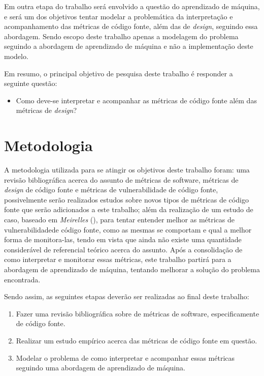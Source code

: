 Em outra etapa do trabalho será envolvido a questão do aprendizado de máquina, e
será um dos objetivos tentar modelar a problemática da interpretação e
acompanhamento das métricas de código fonte, além das de \textit{design},
seguindo essa abordagem. Sendo escopo deste trabalho apenas a modelagem do
problema seguindo a abordagem de aprendizado de máquina e não a implementação
deste modelo.

Em resumo, o principal objetivo de pesquisa deste trabalho é responder a
seguinte questão:

\begin{itemize}
  \item Como deve-se interpretar e acompanhar as métricas de código fonte além 
    das métricas de \textit{design}?
\end{itemize}


\section{Metodologia}

A metodologia utilizada para se atingir os objetivos deste trabalho foram: uma
revisão bibliográfica acerca do assunto de métricas de software, métricas de
\textit{design} de código fonte e métricas de vulnerabilidade de código fonte,
possivelmente serão realizados estudos sobre novos tipos de métricas de código
fonte que serão adicionados a este trabalho; além da realização de um estudo de 
caso, baseado em \emph{Meirelles} (\citeyear{meirelles2013}), para tentar entender 
melhor as métricas de vulnerabilidadede código fonte, como as mesmas se comportam 
e qual a melhor forma de monitora-las, tendo em vista que ainda não existe uma
quantidade considerável de referencial teórico acerca do assunto. Após a
consolidação de como interpretar e monitorar essas métricas, este trabalho
partirá para a abordagem de aprendizado de máquina, tentando melhorar a solução
do problema encontrada.

Sendo assim, as seguintes etapas deverão ser realizadas ao final deste trabalho:

\begin{enumerate}
  \item Fazer uma revisão bibliográfica sobre de métricas de software,
    especificamente de código fonte.
  \item Realizar um estudo empírico acerca das métricas de código fonte em
    questão.
  \item Modelar o problema de como interpretar e acompanhar essas métricas
    seguindo uma abordagem de aprendizado de máquina.
\end{enumerate}


